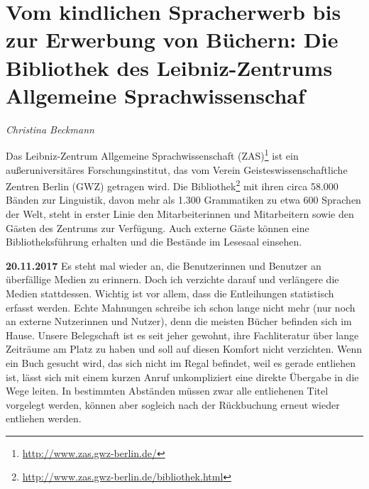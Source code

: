 \documentclass[a4paper,
fontsize=11pt,
oneside,
numbers=noperiodatend,
parskip=half-,
bibliography=totoc,
final
]{scrartcl}
\begin{document}
\hypertarget{vom-kindlichen-spracherwerb-bis-zur-erwerbung-von-buxfcchern-die-bibliothek-des-leibniz-zentrums-allgemeine-sprachwissenschaf}{%
\section*{Vom kindlichen Spracherwerb bis zur Erwerbung von
Büchern: Die Bibliothek des Leibniz-Zentrums Allgemeine
Sprachwissenschaf}\label{vom-kindlichen-spracherwerb-bis-zur-erwerbung-von-buxfcchern-die-bibliothek-des-leibniz-zentrums-allgemeine-sprachwissenschaf}}

\emph{Christina Beckmann}

Das Leibniz-Zentrum Allgemeine Sprachwissenschaft (ZAS)\footnote{\url{http://www.zas.gwz-berlin.de/}}
ist ein außeruniversitäres Forschungsinstitut, das vom Verein
Geisteswissenschaftliche Zentren Berlin (GWZ) getragen wird. Die
Bibliothek\footnote{\url{http://www.zas.gwz-berlin.de/bibliothek.html}}
mit ihren circa 58.000 Bänden zur Linguistik, davon mehr als 1.300
Grammatiken zu etwa 600 Sprachen der Welt, steht in erster Linie den
Mitarbeiterinnen und Mitarbeitern sowie den Gästen des Zentrums zur
Verfügung. Auch externe Gäste können eine Bibliotheksführung erhalten
und die Bestände im Lesesaal einsehen.

\textbf{20.11.2017} Es steht mal wieder an, die Benutzerinnen und
Benutzer an überfällige Medien zu erinnern. Doch ich verzichte darauf
und verlängere die Medien stattdessen. Wichtig ist vor allem, dass die
Entleihungen statistisch erfasst werden. Echte Mahnungen schreibe ich
schon lange nicht mehr (nur noch an externe Nutzerinnen und Nutzer),
denn die meisten Bücher befinden sich im Hause. Unsere Belegschaft ist
es seit jeher gewohnt, ihre Fachliteratur über lange Zeiträume am Platz
zu haben und soll auf diesen Komfort nicht verzichten. Wenn ein Buch
gesucht wird, das sich nicht im Regal befindet, weil es gerade entliehen
ist, lässt sich mit einem kurzen Anruf unkompliziert eine direkte
Übergabe in die Wege leiten. In bestimmten Abständen müssen zwar alle
entliehenen Titel vorgelegt werden, können aber sogleich nach der
Rückbuchung erneut wieder entliehen werden.
\end{document}
